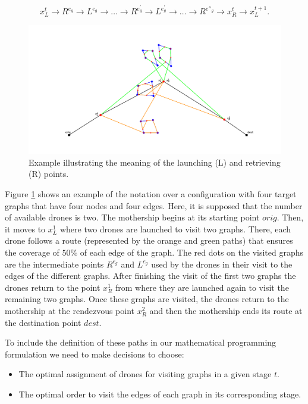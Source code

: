 $$
x_L^t\rightarrow R^{e_g}\rightarrow L^{e_g}\rightarrow\ldots\rightarrow R^{e^\prime_g}\rightarrow L^{e^\prime_g}\rightarrow \ldots \rightarrow R^{e''_g} \rightarrow x_R^t\rightarrow x_L^{t+1}.
$$


\begin{figure}[h!]
\centering
\includegraphics[width=0.95\linewidth]{figures/figure_latex.png}
\caption{Example illustrating the meaning of the launching  (L) and retrieving (R) points.}
\label{fig:illustrative}
\end{figure}

\noindent
Figure \ref{fig:illustrative} shows an example of the notation over a configuration with four target graphs that have four nodes and four edges. Here, it is supposed that the number of available drones is two. %
The mothership begins at its starting point $orig$. Then, it moves to $x_L^1$ where two drones are launched to visit two graphs. There, each drone follows a route (represented by the orange and green paths) that ensures the coverage of $50 \%$ of each edge of the graph. The red dots on the visited graphs are the intermediate points $R^{e_g}$ and $L^{e_g}$ used by the drones in their visit to the edges of the different graphs. After finishing the visit of the first two graphs the drones return to the point $x_R^1$ from where they are launched again to visit the remaining two graphs. Once these graphs are visited, the drones return to the mothership at the rendezvous point $x_R^2$ and then the mothership ends its route at the destination point $dest$.




\noindent
To include the definition of these paths in our mathematical programming formulation we need to make decisions to choose:
\begin{itemize}
    \item The optimal assignment of drones for visiting graphs in a given stage $t$.
    \item The optimal order to visit the edges of each graph in its corresponding stage.
\end{itemize}

